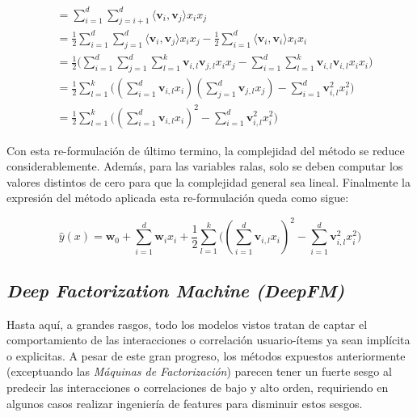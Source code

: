 \documentclass[11pt,a4paper,twoside]{thesis}
\begin{document}
\begin{equation}
	\begin{split}
		&=\sum_{i=1}^d \sum_{j=i+1}^d \langle\mathbf{v}_i, \mathbf{v}_j\rangle x_i x_j \\
		&= \frac{1}{2} \sum_{i=1}^d \sum_{j=1}^d\langle\mathbf{v}_i, \mathbf{v}_j\rangle x_i x_j - \frac{1}{2}\sum_{i=1}^d \langle\mathbf{v}_i, \mathbf{v}_i\rangle x_i x_i \\
		&= \frac{1}{2} \big (\sum_{i=1}^d \sum_{j=1}^d \sum_{l=1}^k\mathbf{v}_{i, l} \mathbf{v}_{j, l} x_i x_j - \sum_{i=1}^d \sum_{l=1}^k \mathbf{v}_{i, l} \mathbf{v}_{i, l} x_i x_i \big)\\
		&=  \frac{1}{2} \sum_{l=1}^k \big ((\sum_{i=1}^d \mathbf{v}_{i, l} x_i) (\sum_{j=1}^d \mathbf{v}_{j, l}x_j) - \sum_{i=1}^d \mathbf{v}_{i, l}^2 x_i^2 \big ) \\
		&= \frac{1}{2} \sum_{l=1}^k \big ((\sum_{i=1}^d \mathbf{v}_{i, l} x_i)^2 - \sum_{i=1}^d \mathbf{v}_{i, l}^2 x_i^2)
	\end{split}
\end{equation}

Con esta re-formulación de último termino, la complejidad del método se reduce
considerablemente. Además, para las variables ralas, solo se deben computar los
valores distintos de cero para que la complejidad general sea lineal.
Finalmente la expresión del método aplicada esta re-formulación queda como
sigue:

\begin{equation}
	\hat{y}(x) = \mathbf{w}_0 + \sum_{i=1}^d \mathbf{w}_i x_i + \frac{1}{2} \sum_{l=1}^k \big ((\sum_{i=1}^d \mathbf{v}_{i, l} x_i)^2 - \sum_{i=1}^d \mathbf{v}_{i, l}^2 x_i^2)
\end{equation}

\clearpage

\subsection{\textit{Deep Factorization Machine (DeepFM)}}

Hasta aquí, a grandes rasgos, todo los modelos vistos tratan de captar el
comportamiento de las interacciones o correlación usuario-ítems ya sean
implícita o explicitas. A pesar de este gran progreso, los métodos expuestos
anteriormente (exceptuando las \textit{Máquinas de Factorización}) parecen
tener un fuerte sesgo al predecir las interacciones o correlaciones de bajo y
alto orden, requiriendo en algunos casos realizar ingeniería de features para
disminuir estos sesgos.
\end{document}
